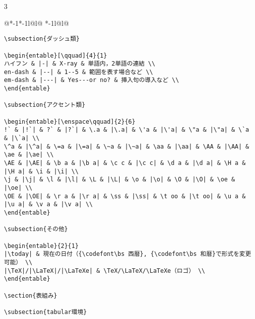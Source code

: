 \documentclass[10pt,a4paper,landscape,dvipdfmx,nomag]{jsarticle}
\makeatletter
\def\set@etsep#1#2{\def\etcolsep{#1}\def\etitemsep{#2}}
\newenvironment{entable}[3][\quad\qquad]{%
  \set@etsep#1\relax\relax
  \begin{tabular}{%
    @{}*{\the\numexpr#3-1}{*{\the\numexpr#2-1}{l@{\etcolsep}}l@{\etitemsep}}%
    *{\the\numexpr#2-1}{l@{\etcolsep}}l@{}}}{%
  \end{tabular}}
\newcommand{\codefont}{\ttfamily\gtfamily}
\makeatother
\begin{document}
\begin{multicols}{3}
\begin{entable}[\enspace]{2}{1}
\begin{verbatim}
\subsection{ダッシュ類}

\begin{entable}[\qquad]{4}{1}
ハイフン & |-| & X-ray & 単語内，2単語の連結 \\
en-dash & |--| & 1--5 & 範囲を表す場合など \\
em-dash & |---| & Yes---or no? & 挿入句の導入など \\
\end{entable}

\subsection{アクセント類}

\begin{entable}[\enspace\qquad]{2}{6}
!` & |!`| & ?` & |?`| & \.a & |\.a| & \'a & |\'a| & \"a & |\"a| & \`a & |\`a| \\
\^a & |\^a| & \=a & |\=a| & \~a & |\~a| & \aa & |\aa| & \AA & |\AA| & \ae & |\ae| \\
\AE & |\AE| & \b a & |\b a| & \c c & |\c c| & \d a & |\d a| & \H a & |\H a| & \i & |\i| \\
\j & |\j| & \l & |\l| & \L & |\L| & \o & |\o| & \O & |\O| & \oe & |\oe| \\
\OE & |\OE| & \r a & |\r a| & \ss & |\ss| & \t oo & |\t oo| & \u a & |\u a| & \v a & |\v a| \\
\end{entable}

\subsection{その他}

\begin{entable}{2}{1}
|\today| & 現在の日付（{\codefont\bs 西暦}, {\codefont\bs 和暦}で形式を変更可能） \\
|\TeX|/|\LaTeX|/|\LaTeXe| & \TeX/\LaTeX/\LaTeXe（ロゴ） \\
\end{entable}

\section{表組み}

\subsection{tabular環境}


\end{verbatim}
\end{entable}
\end{multicols}
\end{document}
